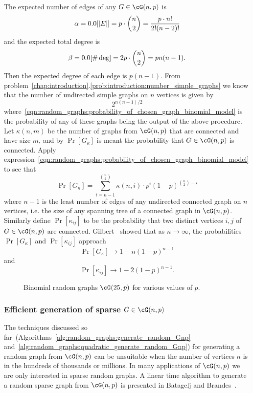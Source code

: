 The expected number of edges of any $G \in \cG(n,p)$ is
\[
\alpha
=
\E[|E|]
=
p \cdot \binom{n}{2}
=
\frac{p \cdot n!} {2! (n - 2)!}
\]
and the expected total degree is
\[
\beta
=
\E[\#\deg]
=
2p \cdot \binom{n}{2}
=
pn(n - 1).
\]
Then the expected degree of each edge is $p(n - 1)$. From
problem~\ref{chap:introduction}.\ref{prob:introduction:number_simple_graphs}
we know that the number of undirected simple graphs on $n$ vertices is
given by
\[
2^{n(n-1) / 2}
\]
where~\eqref{eqn:random_graphs:probability_of_chosen_graph_binomial_model}
is the probability of any of these graphs being the output of the
above procedure. Let $\kappa(n,m)$ be the number of graphs from
$\cG(n,p)$ that are connected and have size $m$, and by $\Pr[G_\kappa]$
is meant the probability that $G \in \cG(n,p)$ is connected. Apply
expression~\eqref{eqn:random_graphs:probability_of_chosen_graph_binomial_model}
to see that
\[
\Pr[G_\kappa]
=
\sum_{i=n-1}^{\binom{n}{2}}
\kappa(n,i) \cdot p^i (1 - p)^{\binom{n}{2} - i}
\]
where $n - 1$ is the least number of edges of any undirected connected
graph on $n$ vertices, i.e. the size of any spanning tree of a
connected graph in $\cG(n,p)$. Similarly define $\Pr[\kappa_{ij}]$ to
be the probability that two distinct vertices $i,j$ of
$G \in \cG(n,p)$ are connected. Gilbert~\cite{Gilbert1959} showed that
as $n \to \infty$, the probabilities $\Pr[G_\kappa]$ and
$\Pr[\kappa_{ij}]$ approach
\[
\Pr[G_\kappa] \to 1 - n(1 - p)^{n-1}
\]
and
\[
\Pr[\kappa_{ij}] \to 1 - 2(1 - p)^{n-1}.
\]

\begin{figure}[!htbp]
\centering
{}

\caption{Binomial random graphs $\cG(25,p)$ for various values of $p$.}
\label{fig:random_graphs:binomial_random_graph_25_nodes}
\end{figure}



\subsubsection{Efficient generation of sparse $G \in \cG(n,p)$}

The techniques discussed so
far~(Algorithms~\ref{alg:random_graphs:generate_random_Gnp}
and~\ref{alg:random_graphs:quadratic_generate_random_Gnp}) for
generating a random graph from $\cG(n,p)$ can be unsuitable when the
number of vertices $n$ is in the hundreds of thousands or millions. In
many applications of $\cG(n,p)$ we are only interested in
sparse random graphs. A linear time algorithm to
generate a random sparse graph from $\cG(n,p)$ is presented in
Batagelj and
Brandes~\cite{BatageljBrandes2005}.


